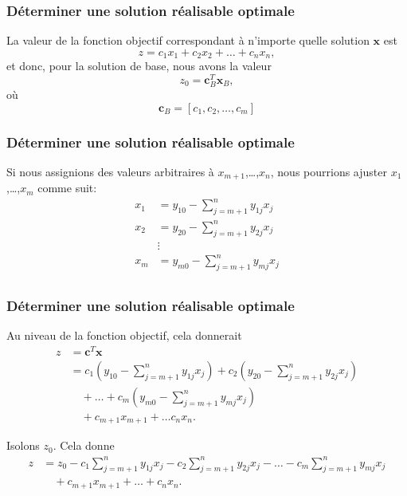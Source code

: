 \documentclass[t,usepdftitle=false]{beamer}
\def\bc{\boldsymbol{c}}
\def\bx{\boldsymbol{x}}
\begin{document}
\begin{frame}
\frametitle{Déterminer une solution réalisable optimale}

La valeur de la fonction objectif correspondant à n'importe quelle solution $\bx$ est
\[
z = c_1x_1 + c_2x_2 + \ldots + c_nx_n,
\]
et donc, pour la solution de base, nous avons la valeur
\[
z_0 = \bc_B^T\bx_B,
\]
où
\[
\bc_B = [ c_1, c_2,\ldots, c_m]
\]
\end{frame}

\begin{frame}
\frametitle{Déterminer une solution réalisable optimale}

Si nous assignions des valeurs arbitraires à $x_{m+1}$,\ldots,$x_n$, nous pourrions ajuster $x_1$,\ldots,$x_m$ comme suit:
\begin{align*}
x_1 &= y_{10} - \sum_{j=m+1}^n y_{1j}x_j \\
x_2 &= y_{20} - \sum_{j=m+1}^n y_{2j}x_j \\
& \vdots \\
x_m &= y_{m0} - \sum_{j=m+1}^n y_{mj}x_j \\
\end{align*}
\end{frame}

\begin{frame}
\frametitle{Déterminer une solution réalisable optimale}

Au niveau de la fonction objectif, cela donnerait
\begin{align*}
z &= \bc^T\bx \\
&= c_1\left( y_{10} - \sum_{j=m+1}^n y_{1j}x_j \right) + c_2\left( y_{20} - \sum_{j=m+1}^n y_{2j}x_j \right) \\
& \quad + \ldots + c_m\left( y_{m0} - \sum_{j=m+1}^n y_{mj}x_j \right) \\
& \quad + c_{m+1} x_{m+1} + \ldots c_nx_n.
\end{align*}

\mbox

Isolons $z_0$. Cela donne
\begin{align*}
z &= z_0 - c_1\sum_{j=m+1}^n y_{1j}x_j
- c_2\sum_{j=m+1}^n y_{2j}x_j - \ldots -
c_m\sum_{j=m+1}^n y_{mj}x_j \\
& \quad + c_{m+1} x_{m+1} + \ldots + c_nx_n.
\end{align*}
\end{frame}
\end{document}
